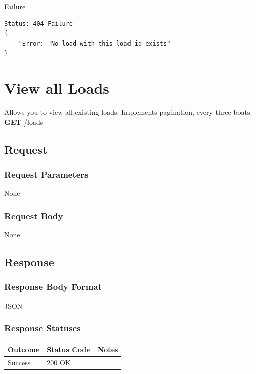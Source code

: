 \documentclass[letterpaper,11pt,titlepage,draftclsnofoot,onecolumn,compsoc,utf8,latin1]{IEEEtran}
\begin{document}
\begin{singlespace}
\noindent \Large{Failure}

\begin{lstlisting}[]
Status: 404 Failure
{
    "Error: "No load with this load_id exists"
}
\end{lstlisting}

\newpage

\normalsize

\section{View all Loads}

Allows you to view all existing loads. Implements pagination, every three boats.\\

\noindent \textbf{GET} /loads

\subsection{Request}

\subsubsection{Request Parameters}

None

\subsubsection{Request Body}

None

\subsection{Response}

\subsubsection{Response Body Format}

JSON

\subsubsection{Response Statuses}

\begin{center}
\begin{tabular}{ |p{}|p{}|p{}| } 
 \hline
 \textbf{Outcome} & \textbf{Status Code} & \textbf{Notes}  \\  \hline
 Success & 200 OK &  \\
 \hline
\end{tabular}
\end{center}


\end{singlespace}
\end{document}
